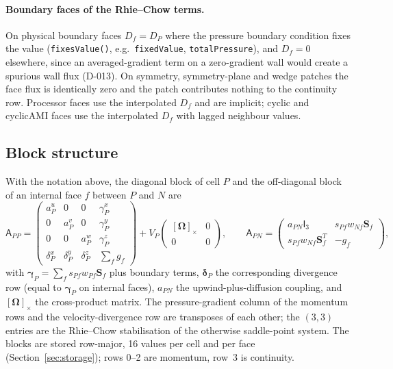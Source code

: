 \documentclass[11pt,a4paper]{article}
\newcommand{\vect}[1]{\mathbf{#1}}
\newcommand{\Sf}{\vect{S}_f}
\newcommand{\code}[1]{\texttt{#1}}
\begin{document}
\paragraph{Boundary faces of the Rhie--Chow terms.}
On physical boundary faces $D_f=D_P$ where the pressure boundary condition
fixes the value (\code{fixesValue()}, e.g.\ \code{fixedValue},
\code{totalPressure}), and $D_f=0$ elsewhere, since an averaged-gradient term
on a zero-gradient wall would create a spurious wall flux (D-013). On
symmetry, symmetry-plane and wedge patches the face flux is identically zero
and the patch contributes nothing to the continuity row. Processor faces use
the interpolated $D_f$ and are implicit; cyclic and cyclicAMI faces use the
interpolated $D_f$ with lagged neighbour values.

\subsection{Block structure}\label{sec:block}

With the notation above, the diagonal block of cell $P$ and the off-diagonal
block of an internal face $f$ between $P$ and $N$ are
\begin{equation}
  \mathsf{A}_{PP} =
  \begin{pmatrix}
    a^u_P & 0 & 0 & \gamma^x_P\\
    0 & a^v_P & 0 & \gamma^y_P\\
    0 & 0 & a^w_P & \gamma^z_P\\
    \delta^x_P & \delta^y_P & \delta^z_P & \sum_f g_f
  \end{pmatrix}
  + V_P\begin{pmatrix}[\vect\Omega]_\times & 0\\ 0 & 0\end{pmatrix},
  \qquad
  \mathsf{A}_{PN} =
  \begin{pmatrix}
    a_{PN}\mathsf{I}_3 & s_{Pf}w_{Nf}\Sf\\
    s_{Pf}w_{Nf}\Sf^T & -g_f
  \end{pmatrix},
  \label{eq:block}
\end{equation}
with $\vect\gamma_P=\sum_f s_{Pf}w_{Pf}\Sf$ plus boundary terms, $\vect\delta_P$
the corresponding divergence row (equal to $\vect\gamma_P$ on internal faces),
$a_{PN}$ the upwind-plus-diffusion coupling, and $[\vect\Omega]_\times$ the
cross-product matrix. The pressure-gradient column of the momentum rows and
the velocity-divergence row are transposes of each other; the $(3,3)$ entries
are the Rhie--Chow stabilisation of the otherwise saddle-point system. The
blocks are stored row-major, 16 values per cell and per face
(Section~\ref{sec:storage}); rows 0--2 are momentum, row~3 is continuity.
\end{document}
